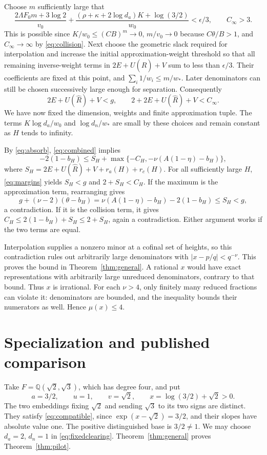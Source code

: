 \documentclass[11pt]{article}
\newcommand{\Q}{\mathbb Q}
\theoremstyle{remark}
\begin{document}
Choose $m$ sufficiently large that
\begin{equation}\label{eq:dimensionmargin}
\frac{2\Lambda F_0m+3\log2}{v_0}
+\frac{(\rho+\kappa+2\log d_a)K+\log(3/2)}{w_0}
<\epsilon/3,
\qquad C_\infty>3.
\end{equation}
This is possible since $K/w_0\le(CB)^m\to0$,
$m/v_0\to0$ because $C\theta/B>1$, and
$C_\infty\to\infty$ by \eqref{eq:collision}.
Next choose the geometric slack required for interpolation and increase
the initial approximation-weight threshold so that all remaining
inverse-weight terms in $2E+U(\widehat R)+V$ sum to less than
$\epsilon/3$. Their coefficients are fixed at this point, and
$\sum_i1/w_i\le m/w_*$. Later denominators can still be chosen
successively large enough for separation. Consequently
\begin{equation}\label{eq:margins}
2E+U(\widehat R)+V<g,
\qquad 2+2E+U(\widehat R)+V<C_\infty.
\end{equation}
We have now fixed the dimension, weights and finite approximation tuple.
The terms $K\log d_a/w_0$ and $\log d_n/w_*$ are small by these choices
and remain constant as $H$ tends to infinity.

By \eqref{eq:absorb}, \eqref{eq:combined} implies
\[
-2(1-b_H)\le S_H+
\max\{-C_H,-\nu(A(1-\eta)-b_H)\},
\]
where $S_H=2E+U(\widehat R)+V+r_a(H)+r_c(H)$.
For all sufficiently large $H$, \eqref{eq:margins} yields
$S_H<g$ and $2+S_H<C_H$.
If the maximum is the approximation term, rearranging gives
\[
g+(\nu-2)(\theta-b_H)
=\nu(A(1-\eta)-b_H)-2(1-b_H)\le S_H<g,
\]
a contradiction. If it is the collision term, it gives
$C_H\le2(1-b_H)+S_H\le2+S_H$, again a contradiction.
Either argument works if the two terms are equal.

Interpolation supplies a nonzero minor at a cofinal set of heights, so
this contradiction rules out arbitrarily large denominators with
$|x-p/q|<q^{-\nu}$. This proves the bound in
Theorem~\ref{thm:general}. A rational $x$ would have exact
representations with arbitrarily large unreduced denominators, contrary
to that bound. Thus $x$ is irrational. For each $\nu>4$, only finitely
many reduced fractions can violate it: denominators are bounded, and
the inequality bounds their numerators as well. Hence $\mu(x)\le4$.

\section{Specialization and published comparison}
Take $F=\Q(\sqrt2,\sqrt3)$, which has degree four, and put
\[
a=3/2,\qquad u=1,\qquad v=\sqrt2,\qquad
x=\log(3/2)+\sqrt2>0.
\]
The two embeddings fixing $\sqrt2$ and sending $\sqrt3$ to its
two signs are distinct. They satisfy \eqref{eq:compatible}, since
$\exp(x-\sqrt2)=3/2$, and their slopes have absolute value one.
The positive distinguished base is $3/2\ne1$. We may choose
$d_a=2$, $d_n=1$ in \eqref{eq:fixedclearing}.
Theorem~\ref{thm:general} proves Theorem~\ref{thm:pilot}.
\end{document}
